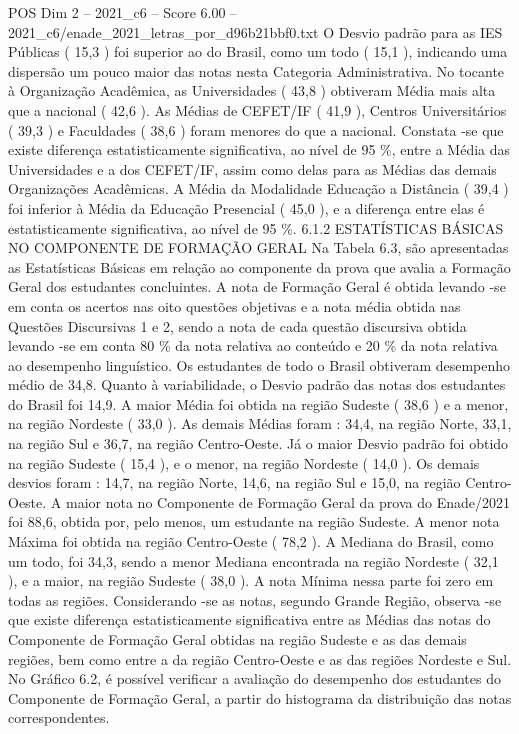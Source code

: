 \begin{textsample}{POS Dim 2 – 2021\_c6 – Score 6.00 – 2021\_c6/enade\_2021\_letras\_por\_d96b21bbf0.txt}
O Desvio padrão para as IES Públicas ( 15,3 ) foi superior ao do Brasil, como um todo ( 15,1 ), indicando uma dispersão um pouco maior das notas nesta Categoria Administrativa.
No tocante à Organização Acadêmica, as Universidades ( 43,8 ) obtiveram Média mais alta que a nacional ( 42,6 ).
As Médias de CEFET/IF ( 41,9 ), Centros Universitários ( 39,3 ) e Faculdades ( 38,6 ) foram menores do que a nacional.
Constata -se que existe diferença estatisticamente significativa, ao nível de 95 \%, entre a Média das Universidades e a dos CEFET/IF, assim como delas para as Médias das demais Organizações Acadêmicas.
A Média da Modalidade Educação a Distância ( 39,4 ) foi inferior à Média da Educação Presencial ( 45,0 ), e a diferença entre elas é estatisticamente significativa, ao nível de 95 \%. 6.1.2 ESTATÍSTICAS BÁSICAS NO COMPONENTE DE FORMAÇÃO GERAL Na Tabela 6.3, são apresentadas as Estatísticas Básicas em relação ao componente da prova que avalia a Formação Geral dos estudantes concluintes.
A nota de Formação Geral é obtida levando -se em conta os acertos nas oito questões objetivas e a nota média obtida nas Questões Discursivas 1 e 2, sendo a nota de cada questão discursiva obtida levando -se em conta 80 \% da nota relativa ao conteúdo e 20 \% da nota relativa ao desempenho linguístico.
Os estudantes de todo o Brasil obtiveram desempenho médio de 34,8.
Quanto à variabilidade, o Desvio padrão das notas dos estudantes do Brasil foi 14,9.
A maior Média foi obtida na região Sudeste ( 38,6 ) e a menor, na região Nordeste ( 33,0 ).
As demais Médias foram : 34,4, na região Norte, 33,1, na região Sul e 36,7, na região Centro-Oeste.
Já o maior Desvio padrão foi obtido na região Sudeste ( 15,4 ), e o menor, na região Nordeste ( 14,0 ).
Os demais desvios foram : 14,7, na região Norte, 14,6, na região Sul e 15,0, na região Centro-Oeste.
A maior nota no Componente de Formação Geral da prova do Enade/2021 foi 88,6, obtida por, pelo menos, um estudante na região Sudeste.
A menor nota Máxima foi obtida na região Centro-Oeste ( 78,2 ).
A Mediana do Brasil, como um todo, foi 34,3, sendo a menor Mediana encontrada na região Nordeste ( 32,1 ), e a maior, na região Sudeste ( 38,0 ).
A nota Mínima nessa parte foi zero em todas as regiões.
Considerando -se as notas, segundo Grande Região, observa -se que existe diferença estatisticamente significativa entre as Médias das notas do Componente de Formação Geral obtidas na região Sudeste e as das demais regiões, bem como entre a da região Centro-Oeste e as das regiões Nordeste e Sul.
No Gráfico 6.2, é possível verificar a avaliação do desempenho dos estudantes do Componente de Formação Geral, a partir do histograma da distribuição das notas correspondentes.

\end{textsample}

